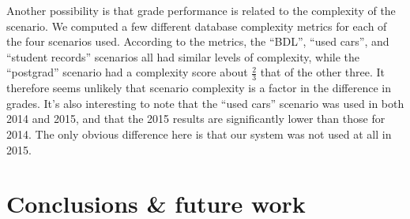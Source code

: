 \documentclass[sigconf, authordraft, capitalise]{acmart}
\begin{document}


Another possibility is that grade performance is related to the complexity of the scenario. We computed a few different database complexity metrics \cite{Jamil.B-2010a-SMARtS,Piattini.M-2001a-Table,Pavlic.M-2008a-Database,Calero.C-2001a-Database,Sinha.B-2014a-Estimation} for each of the four scenarios used. According to the metrics, the ``BDL'', ``used cars'', and ``student records'' scenarios all had similar levels of complexity, while the ``postgrad'' scenario had a complexity score about \(\frac{2}{3}\) that of the other three. It therefore seems unlikely that scenario complexity is a factor in the difference in grades. It's also interesting to note that the ``used cars'' scenario was used in both 2014 and 2015, and that the 2015 results are significantly lower than those for 2014. The only obvious difference here is that our system was not used at all in 2015.

\section{Conclusions \& future work}
\label{sec-conclusion}




\end{document}
